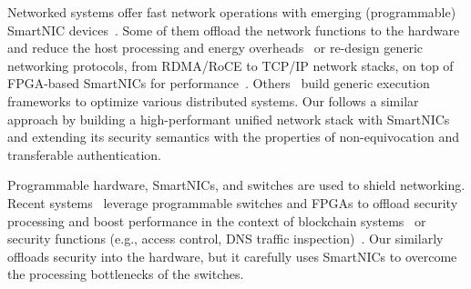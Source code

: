  Networked systems offer fast network operations with emerging (programmable) SmartNIC devices~\cite{liquidIO_smartnics,u280_smartnics,bluefield_smartnics,broadcom_smartnics,netronome_smartnics,alibaba_smartnics,nitro_smartnics,msr_smartnics}. Some of them offload the network functions to the hardware and reduce the host processing and energy overheads~\cite{246498,211249,10.1145/3387514.3405895,10.1145/3365609.3365851,10.1145/3127479.3132252,258971,246486,179716,227655,10.1145/3286062.3286068,shan2022supernic,10.1145/3390251.3390257} or re-design generic networking protocols, from RDMA/RoCE to TCP/IP network stacks, on top of FPGA-based SmartNICs for performance~\cite{coyote,corundum,storm,8891991,280712,9114811,opennic_project}. Others~\cite{10.1145/3341302.3342079,10.1145/2872362.2872367,234944,9220629,6853195,10292786,10.1145/3477132.3483555,280678,10.1145/3132747.3132756,honeycomb,288659,10329593} build generic execution frameworks to optimize various distributed systems. Our \projecttitle{} follows a similar approach by building a high-performant unified network stack with SmartNICs and extending its security semantics with the properties of non-equivocation and transferable authentication.%



 Programmable hardware, SmartNICs, and switches are used to shield networking. Recent systems~\cite{10.1145/3603269.3604874, 10.1145/3620678.3624786, 10.1145/3563647.3563654, 10.1145/3321408.3323087, 278292} leverage programmable switches and FPGAs to offload security processing and boost performance in the context of blockchain systems~\cite{10.1145/3603269.3604874} or security functions (e.g., access control, DNS traffic inspection)~\cite{10.1145/3620678.3624786, 10.1145/3563647.3563654, 10.1145/3321408.3323087}. Our \projecttitle{} similarly offloads security into the hardware, but it carefully uses SmartNICs to overcome the processing bottlenecks of the switches.